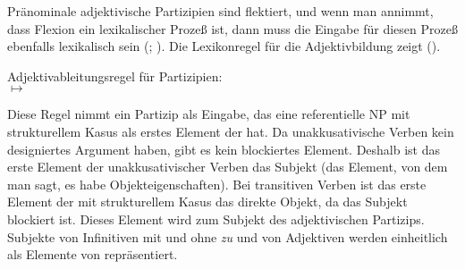 {Pränominale adjektivische Partizipien sind flektiert, und
wenn man annimmt, dass Flexion ein lexikalischer Prozeß ist, dann muss die Eingabe
für diesen Prozeß ebenfalls lexikalisch sein (\citealp[]{Dowty78a};
\citealp[]{Bresnan82a}).
%
Die Lexikonregel für die Adjektivbildung zeigt ().

\eas
\label{lr-adjective-formation-da-approach}
Adjektivableitungsregel für Partizipien:\\
%
%
 $\mapsto$\\
\zs

\noindent
Diese Regel nimmt ein Partizip als Eingabe, das eine referentielle NP mit strukturellem
Kasus als erstes Element der \compsl hat. Da unakkusativische Verben kein designiertes
Argument haben, gibt es kein blockiertes Element. Deshalb ist das erste
Element der \compsl unakkusativischer Verben das Subjekt (das Element, von dem
man sagt, es habe Objekteigenschaften). Bei transitiven Verben ist das
erste Element der \compsl mit strukturellem Kasus das direkte Objekt, da das Subjekt
blockiert ist. Dieses Element wird zum Subjekt des adjektivischen Partizips.
Subjekte von Infinitiven mit und ohne \emph{zu} und von Adjektiven werden
einheitlich als Elemente von \subj repräsentiert. 

}
